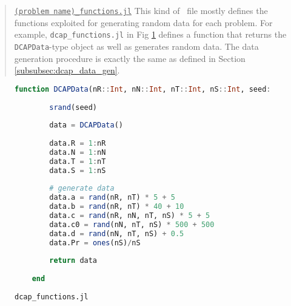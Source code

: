 \begin{quote}
\noindent\underline{\texttt{(problem name)\_functions.jl}} This kind of \julia\ file mostly defines the functions exploited for generating random data for each problem. For example, \texttt{dcap\_functions.jl} in Fig \ref{fig:dcap_functions} defines a function that returns the \texttt{DCAPData}-type object as well as generates random data. The data generation procedure is exactly the same as defined in Section \ref{subsubsec:dcap_data_gen}.
\end{quote}
\begin{figure}[H]
	\centering
	\begin{lstlisting}[frame=single,language=julia]
	function DCAPData(nR::Int, nN::Int, nT::Int, nS::Int, seed::Int=1)::DCAPData
	
		srand(seed)
		
		data = DCAPData()
		
		data.R = 1:nR
		data.N = 1:nN
		data.T = 1:nT
		data.S = 1:nS
		
		# generate data
		data.a = rand(nR, nT) * 5 + 5
		data.b = rand(nR, nT) * 40 + 10
		data.c = rand(nR, nN, nT, nS) * 5 + 5
		data.c0 = rand(nN, nT, nS) * 500 + 500
		data.d = rand(nN, nT, nS) + 0.5
		data.Pr = ones(nS)/nS
		
		return data
		
	end
	\end{lstlisting}
	\caption{\texttt{dcap\_functions.jl}}\label{fig:dcap_functions}
\end{figure}

